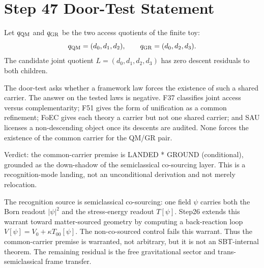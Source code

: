 \section*{Step 47 Door-Test Statement}

Let \(q_{\rm QM}\) and \(q_{\rm GR}\) be the two access quotients of the
finite toy:
\[
q_{\rm QM}=(d_0,d_1,d_2), \qquad q_{\rm GR}=(d_0,d_2,d_3).
\]
The candidate joint quotient \(L=(d_0,d_1,d_2,d_3)\) has zero descent
residuals to both children.

The door-test asks whether a framework law forces the existence of such a
shared carrier. The answer on the tested laws is negative. F37 classifies
joint access versus complementarity; F51 gives the form of unification as a
common refinement; FoEC gives each theory a carrier but not one shared carrier;
and SAU licenses a non-descending object once its descents are audited. None
forces the existence of the common carrier for the QM/GR pair.

Verdict: the common-carrier premise is LANDED * GROUND (conditional), grounded
as the down-shadow of the semiclassical co-sourcing layer. This is a
recognition-mode landing, not an unconditional derivation and not merely
relocation.

The recognition source is semiclassical co-sourcing: one field \(\psi\) carries
both the Born readout \(|\psi|^2\) and the stress-energy readout \(T[\psi]\).
Step26 extends this warrant toward matter-sourced geometry by computing a
back-reaction loop \(V[\psi]=V_0+\kappa T_{00}[\psi]\). The non-co-sourced
control fails this warrant. Thus the common-carrier premise is warranted, not
arbitrary, but it is not an SBT-internal theorem. The remaining residual is the
free gravitational sector and trans-semiclassical frame transfer.
